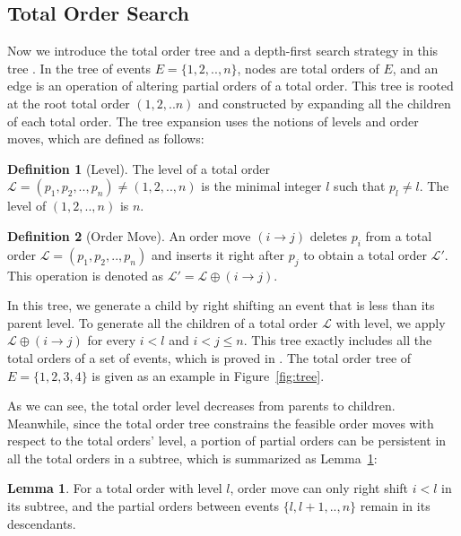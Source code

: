 \documentclass[letterpaper]{article} %
\theoremstyle{definition}
\newtheorem{definition}{Definition}
\newtheorem{lemma}{Lemma}
\newcommand{\LE}{\mathcal{L}}
\begin{document}
\subsection{Total Order Search}
\label{sec:approach:tree}

Now we introduce the total order tree \cite{ono2005constant} and a depth-first search strategy in this tree \cite{wang2015}. In the tree of events $E = \{1,2,..,n\}$, nodes are total orders of $E$, and an edge is an operation of altering partial orders of a total order. This tree is rooted at the root total order $(1,2,..n)$ and constructed by expanding all the children of each total order. The tree expansion uses the notions of levels and order moves, which are defined as follows:

\begin{definition}[Level]
\label{def:level}
The level of a total order $\LE = (p_1, p_2,..,p_n) \not = (1,2,..,n)$ is the minimal integer $l$ such that $p_l \not = l$. The level of $(1,2,..,n)$ is $n$.\end{definition}

\begin{definition}[Order Move]
\label{def:move}
An order move $(i \rightarrow j)$ deletes $p_i$ from a total order $\LE = (p_1, p_2,..,p_n)$ and inserts it right after $p_j$ to obtain a total order $\LE'$. This operation is denoted as $\LE' = \LE \oplus (i \rightarrow j)$.
\end{definition}

In this tree, we generate a child by right shifting an event that is less than its parent level. To generate all the children of a total order $\LE$  with level, we apply $\LE \oplus (i \rightarrow j)$ for every $i < l$ and $i < j \leq n$. This tree exactly includes all the total orders of a set of events, which is proved in \cite{ono2005constant}. The total order tree of $E=\{1,2,3,4\}$ is given as an example in Figure~\ref{fig:tree}.

As we can see, the total order level decreases from parents to children. Meanwhile, since the total order tree constrains the feasible order moves with respect to the total orders' level, a portion of partial orders can be persistent in all the total orders in a subtree, which is summarized as Lemma~\ref{lemma:fixed_in_children}:

\begin{lemma}\label{lemma:fixed_in_children}
For a total order with level $l$, order move can only right shift $i < l$ in its subtree, and the partial orders between events $\{l, l+1,..,n\}$ remain in its descendants.
\end{lemma}
\end{document}
